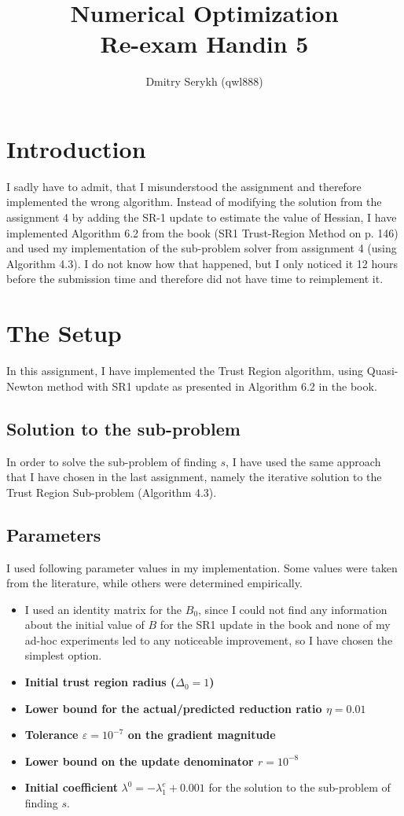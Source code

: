 \documentclass[a4paper]{article}
\title{\vspace{-5cm} Numerical Optimization \\ Re-exam Handin 5}
\author{Dmitry Serykh (qwl888)}
\begin{document}
\maketitle
\section{Introduction}
I sadly have to admit, that I misunderstood the assignment and therefore
implemented the wrong algorithm. Instead of modifying the solution from the
assignment 4 by adding the SR-1 update to estimate the value of Hessian, I have
implemented Algorithm 6.2 from the book (SR1 Trust-Region Method on p. 146)
and used my implementation of the sub-problem solver from assignment 4 (using
Algorithm 4.3). I do not know how that happened, but I only noticed it 12 hours
before the submission time and therefore did not have time to reimplement it.

\section{The Setup}
In this assignment, I have implemented the Trust Region algorithm, using
Quasi-Newton method with SR1 update as presented in Algorithm 6.2 in the book.

\subsection{Solution to the sub-problem}
In order to solve the sub-problem of finding $s$, I have used the same approach
that I have chosen in the last assignment, namely the iterative solution to the
Trust Region Sub-problem (Algorithm 4.3).

\subsection{Parameters}
I used following parameter values in my implementation. Some values were taken
from the literature, while others were determined empirically.
\begin{itemize}
\item I used an identity matrix for the $B_0$, since I could not find any
  information about the initial value of $B$ for the SR1 update in the book and
  none of my ad-hoc experiments led to any noticeable improvement, so I have
  chosen the simplest option.
\item \textbf{Initial trust region radius ($\Delta_0 = 1$)}
\item \textbf{Lower bound for the actual/predicted reduction ratio $\eta=0.01$}
\item \textbf{Tolerance $\varepsilon = 10^{-7}$ on the gradient magnitude}
\item \textbf{Lower bound on the update denominator $r=10^{-8}$}
\item \textbf{Initial coefficient} $\lambda^{0}= -\lambda_1^e + 0.001$ for the
  solution to the sub-problem of finding $s$.
\end{itemize}
\end{document}

